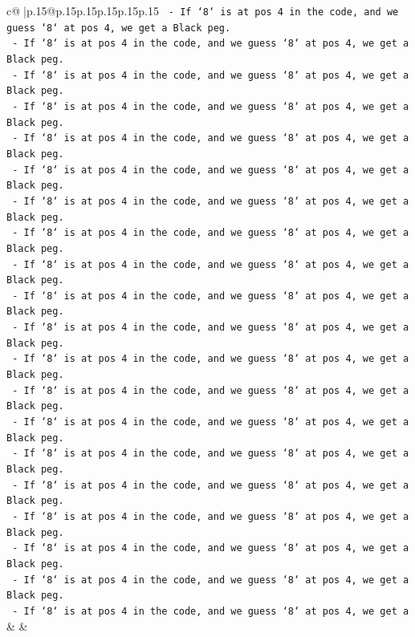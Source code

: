 \documentclass{article}
\begin{document}
{\begin{supertabular}{c@{$\;$}|p{.15\linewidth}@{}p{.15\linewidth}p{.15\linewidth}p{.15\linewidth}p{.15\linewidth}p{.15\linewidth}}
{{{\texttt{    {-} If `8` is at pos 4 in the code, and we guess `8` at pos 4, we get a Black peg.} \\
\texttt{    {-} If `8` is at pos 4 in the code, and we guess `8` at pos 4, we get a Black peg.} \\
\texttt{    {-} If `8` is at pos 4 in the code, and we guess `8` at pos 4, we get a Black peg.} \\
\texttt{    {-} If `8` is at pos 4 in the code, and we guess `8` at pos 4, we get a Black peg.} \\
\texttt{    {-} If `8` is at pos 4 in the code, and we guess `8` at pos 4, we get a Black peg.} \\
\texttt{    {-} If `8` is at pos 4 in the code, and we guess `8` at pos 4, we get a Black peg.} \\
\texttt{    {-} If `8` is at pos 4 in the code, and we guess `8` at pos 4, we get a Black peg.} \\
\texttt{    {-} If `8` is at pos 4 in the code, and we guess `8` at pos 4, we get a Black peg.} \\
\texttt{    {-} If `8` is at pos 4 in the code, and we guess `8` at pos 4, we get a Black peg.} \\
\texttt{    {-} If `8` is at pos 4 in the code, and we guess `8` at pos 4, we get a Black peg.} \\
\texttt{    {-} If `8` is at pos 4 in the code, and we guess `8` at pos 4, we get a Black peg.} \\
\texttt{    {-} If `8` is at pos 4 in the code, and we guess `8` at pos 4, we get a Black peg.} \\
\texttt{    {-} If `8` is at pos 4 in the code, and we guess `8` at pos 4, we get a Black peg.} \\
\texttt{    {-} If `8` is at pos 4 in the code, and we guess `8` at pos 4, we get a Black peg.} \\
\texttt{    {-} If `8` is at pos 4 in the code, and we guess `8` at pos 4, we get a Black peg.} \\
\texttt{    {-} If `8` is at pos 4 in the code, and we guess `8` at pos 4, we get a Black peg.} \\
\texttt{    {-} If `8` is at pos 4 in the code, and we guess `8` at pos 4, we get a Black peg.} \\
\texttt{    {-} If `8` is at pos 4 in the code, and we guess `8` at pos 4, we get a Black peg.} \\
\texttt{    {-} If `8` is at pos 4 in the code, and we guess `8` at pos 4, we get a Black peg.} \\
\texttt{    {-} If `8` is at pos 4 in the code, and we guess `8` at pos 4, we get a} \\
            }
        }
    }
    & & \\ \\


\end{supertabular}}
\end{document}
